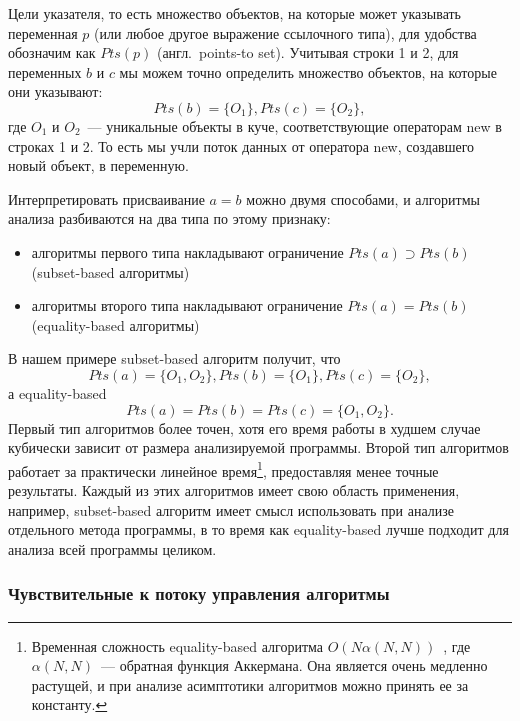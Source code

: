 \documentclass[14pt,titlepage]{extarticle}
\newcommand{\eng}[1]{{\English#1}}
\newcommand{\engdef}[1]{(англ.~\eng{#1})}
\begin{document}
        Цели указателя, то есть множество объектов, на которые может указывать
        переменная $p$ (или любое другое выражение ссылочного типа), для
        удобства обозначим как $Pts(p)$ \engdef{points-to set}.
        Учитывая строки 1 и 2, для переменных $b$ и $c$ мы можем точно
        определить множество объектов, на которые они указывают:
        \[Pts(b) = \{O_1\}, Pts(c) = \{O_2\},\]
        где $O_1$ и $O_2$~--- уникальные объекты в куче, соответствующие
        операторам \eng{new} в строках 1 и 2.  То есть мы учли поток данных от
        оператора \eng{new}, создавшего новый объект, в переменную.

        Интерпретировать присваивание $a = b$ можно двумя способами,
        и алгоритмы анализа разбиваются на два типа по этому признаку:
        \begin{itemize}
          \item алгоритмы первого типа накладывают ограничение
                $Pts(a) \supset Pts(b)$
                (\eng{subset-based} алгоритмы)~\cite{andersen}
          \item алгоритмы второго типа накладывают ограничение
                $Pts(a) = Pts(b)$
                (\eng{equality-based} алгоритмы)~\cite{steensgaard}
        \end{itemize}
        В нашем примере \eng{subset-based} алгоритм получит, что
        \[Pts(a) = \{O_1, O_2\}, Pts(b) = \{O_1\}, Pts(c) = \{O_2\},\]
        а \eng{equality-based}
        \[Pts(a) = Pts(b) = Pts(c) = \{O_1, O_2\}.\]
        Первый тип алгоритмов более точен, хотя его время работы в худшем
        случае кубически зависит от размера анализируемой программы.
        Второй тип алгоритмов работает за практически линейное время\footnote{
          Временная сложность \eng{equality-based} алгоритма
          $O(N \alpha(N,N))$~\cite{steensgaard}, где $\alpha(N,N)$~--- обратная
          функция Аккермана. Она является очень медленно растущей, и при
          анализе асимптотики алгоритмов можно принять ее за константу.
        },
        предоставляя менее точные результаты.
        Каждый из этих алгоритмов имеет свою область применения, например,
        \eng{subset-based} алгоритм имеет смысл использовать при анализе
        отдельного метода программы, в то время как \eng{equality-based} лучше
        подходит для анализа всей программы целиком.


      \subsubsection{Чувствительные к потоку управления алгоритмы}
        \label{section:analysis_classification_control_flow}
\end{document}
